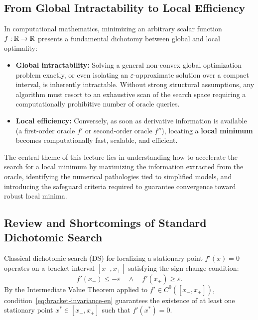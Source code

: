 \subsection{From Global Intractability to Local Efficiency}
In computational mathematics, minimizing an arbitrary scalar function $f: \mathbb{R} \to \mathbb{R}$ presents a fundamental dichotomy between global and local optimality:
\begin{itemize}
    \item \textbf{Global intractability:} Solving a general non-convex global optimization problem exactly, or even isolating an $\varepsilon$-approximate solution over a compact interval, is inherently intractable. Without strong structural assumptions, any algorithm must resort to an exhaustive scan of the search space requiring a computationally prohibitive number of oracle queries.
    \item \textbf{Local efficiency:} Conversely, as soon as derivative information is available (a first-order oracle $f'$ or second-order oracle $f''$), locating a \textbf{local minimum} becomes computationally fast, scalable, and efficient.
\end{itemize}

The central theme of this lecture lies in understanding how to accelerate the search for a local minimum by maximizing the information extracted from the oracle, identifying the numerical pathologies tied to simplified models, and introducing the safeguard criteria required to guarantee convergence toward robust local minima.

\subsection{Review and Shortcomings of Standard Dichotomic Search}
Classical dichotomic search (DS) for localizing a stationary point $f'(x) = 0$ operates on a bracket interval $[x_-, x_+]$ satisfying the sign-change condition:
\begin{equation}
    f'(x_-) \le -\varepsilon \quad \land \quad f'(x_+) \ge \varepsilon.
    \label{eq:bracket-invariance-en}
\end{equation}
By the Intermediate Value Theorem applied to $f' \in C^0([x_-, x_+])$, condition~\eqref{eq:bracket-invariance-en} guarantees the existence of at least one stationary point $x^* \in [x_-, x_+]$ such that $f'(x^*) = 0$.

